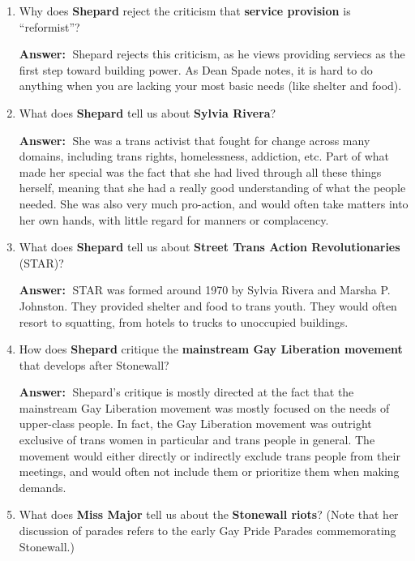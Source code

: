 \documentclass{article}
\newcommand{\answer}{\textbf{Answer:}$\;$}
\begin{document}
\begin{enumerate}[label=\arabic*)]
    \answer
    In Shepard's words:
    ``The modern transgender movement had its beginnings in 1966, when transgender patrons rioted after being denied services at Compton's Cafeteria in San Francisco.''
    
    \item Why does \textbf{Shepard} reject the criticism that \textbf{service provision} is ``reformist''?
    
    \answer 
    Shepard rejects this criticism, as he views providing serviecs as the first step toward building power.
    As Dean Spade notes, it is hard to do anything when you are lacking your most basic needs (like shelter and food).
    
    \item What does \textbf{Shepard} tell us about \textbf{Sylvia Rivera}?
    
    \answer
    She was a trans activist that fought for change across many domains, including trans rights, homelessness, addiction, etc.
    Part of what made her special was the fact that she had lived through all these things herself, meaning that she had a really good understanding of what the people needed.
    She was also very much pro-action, and would often take matters into her own hands, with little regard for manners or complacency.

    \item What does \textbf{Shepard} tell us about \textbf{Street Trans Action Revolutionaries} (STAR)?
    
    \answer
    STAR was formed around 1970 by Sylvia Rivera and Marsha P. Johnston.
    They provided shelter and food to trans youth.
    They would often resort to squatting, from hotels to trucks to unoccupied buildings.
    
    
    \item How does \textbf{Shepard} critique the \textbf{mainstream Gay Liberation movement} that develops after Stonewall?
    
    \answer
    Shepard's critique is mostly directed at the fact that the mainstream Gay Liberation movement was mostly focused on the needs of upper-class people.
    In fact, the Gay Liberation movement was outright exclusive of trans women in particular and trans people in general.
    The movement would either directly or indirectly exclude trans people from their meetings, and would often not include them or prioritize them when making demands.
    
    \item What does \textbf{Miss Major} tell us about the \textbf{Stonewall riots}? (Note that her discussion of parades refers to the early Gay Pride Parades commemorating Stonewall.)


\end{enumerate}
\end{document}
